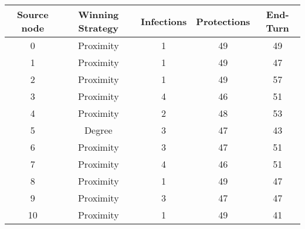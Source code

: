 \documentclass[results.tex]{subfiles}
\begin{document}
    \begin{center}
        \begin{tabular}{| c || c | c | c | c |}
            \hline
            {\bfseries Source node} & {\bfseries Winning Strategy} & {\bfseries Infections} & {\bfseries Protections}
            & {\bfseries End-Turn}
            \\  %
            \hline\hline
            0                       & Proximity                    & 1                      & 49                      & 49                   \\
            \hline
            1                       & Proximity                    & 1                      & 49                      & 47                   \\
            \hline
            2                       & Proximity                    & 1                      & 49                      & 57                   \\
            \hline
            3                       & Proximity                    & 4                      & 46                      & 51                   \\
            \hline
            4                       & Proximity                    & 2                      & 48                      & 53                   \\
            \hline
            5                       & Degree                       & 3                      & 47                      & 43                   \\
            \hline
            6                       & Proximity                    & 3                      & 47                      & 51                   \\
            \hline
            7                       & Proximity                    & 4                      & 46                      & 51                   \\
            \hline
            8                       & Proximity                    & 1                      & 49                      & 47                   \\
            \hline
            9                       & Proximity                    & 3                      & 47                      & 47                   \\
            \hline
            10                      & Proximity                    & 1                      & 49                      & 41                   \\

\end{tabular}
\end{center}
\end{document}
